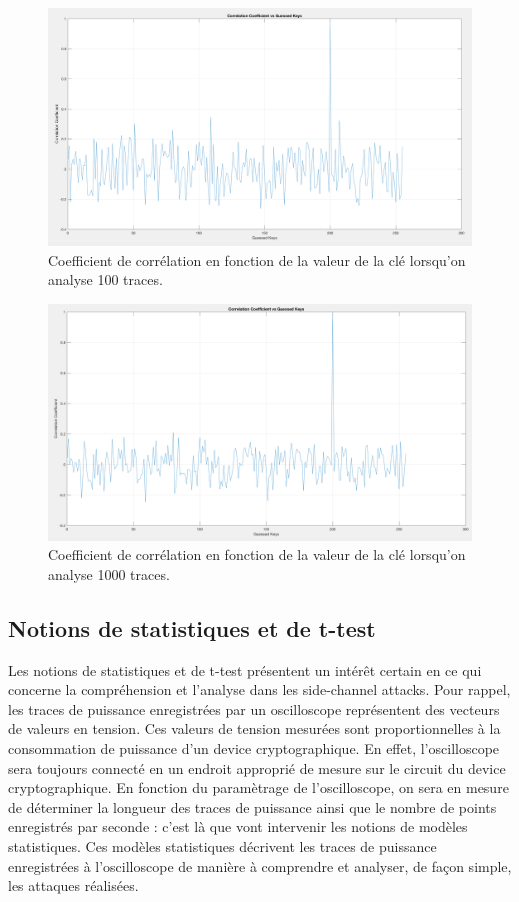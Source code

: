 \documentclass[10pt, oneside, a4paper]{article}
\begin{document}
\begin{figure}[htbp]
    \centering
    \includegraphics[width=1.05\textwidth]{image/100}    \caption{Coefficient de corrélation en fonction de la valeur de la clé lorsqu'on analyse 100 traces.}    \label{fig:100}
\end{figure}

\begin{figure}[htbp]
    \centering
    \includegraphics[width=1.05\textwidth]{image/1000}    \caption{Coefficient de corrélation en fonction de la valeur de la clé lorsqu'on analyse 1000 traces.}    \label{fig:1000}
\end{figure}


\newpage

\subsection{Notions de statistiques et de t-test}

Les notions de statistiques et de t-test présentent un intérêt certain en ce qui concerne la compréhension et l'analyse dans les side-channel attacks. Pour rappel, les traces de puissance enregistrées par un oscilloscope représentent des vecteurs de valeurs en tension. Ces valeurs de tension mesurées sont proportionnelles à la consommation de puissance d'un device cryptographique. En effet, l'oscilloscope sera toujours connecté en un endroit approprié de mesure sur le circuit du device cryptographique. En fonction du paramètrage de l'oscilloscope, on sera en mesure de déterminer la longueur des traces de puissance ainsi que le nombre de points enregistrés par seconde : c'est là que vont intervenir les notions de modèles statistiques. Ces modèles statistiques décrivent les traces de puissance enregistrées à l'oscilloscope de manière à comprendre et analyser, de façon simple, les attaques réalisées.
\end{document}
